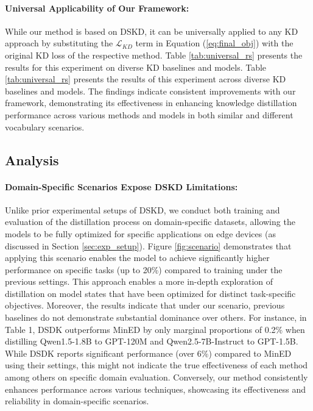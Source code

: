 \paragraph{Universal Applicability of Our Framework:} While our method is based on DSKD, it can be universally applied to any KD approach by substituting the $\mathcal{L}_{KD}$ term in Equation (\ref{eq:final_obj}) with the original KD loss of the respective method. Table \ref{tab:universal_rs} presents the results for this experiment on diverse KD baselines and models. Table \ref{tab:universal_rs} presents the results of this experiment across diverse KD baselines and models. The findings indicate consistent improvements with our framework, demonstrating its effectiveness in enhancing knowledge distillation performance across various methods and models in both similar and different vocabulary scenarios.

\subsection{Analysis}

\paragraph{Domain-Specific Scenarios Expose DSKD Limitations:} Unlike prior experimental setups of DSKD, we conduct both training and evaluation of the distillation process on domain-specific datasets, allowing the models to be fully optimized for specific applications on edge devices (as discussed in Section \ref{sec:exp_setup}). Figure \ref{fig:scenario} demonstrates that applying this scenario enables the model to achieve significantly higher performance on specific tasks (up to 20\%) compared to training under the previous settings. This approach enables a more in-depth exploration of distillation on model states that have been optimized for distinct task-specific objectives. Moreover, the results indicate that under our scenario, previous baselines do not demonstrate substantial dominance over others. For instance, in Table 1, DSDK outperforms MinED by only marginal proportions of 0.2\% when distilling Qwen1.5-1.8B to GPT-120M and Qwen2.5-7B-Instruct to GPT-1.5B. While DSDK reports significant performance (over 6\%) compared to MinED using their settings, this might not indicate the true effectiveness of each method among others on specific domain evaluation. Conversely, our method consistently enhances performance across various techniques, showcasing its effectiveness and reliability in domain-specific scenarios.


